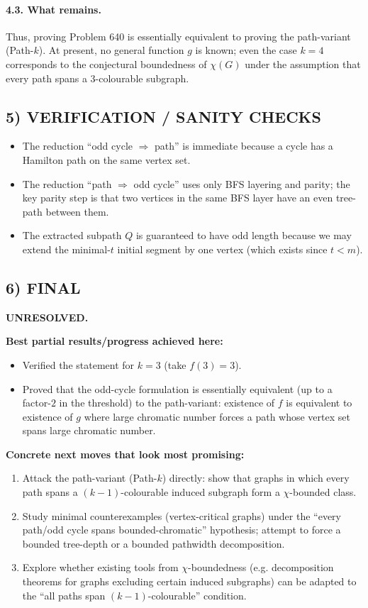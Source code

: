 \paragraph{4.3. What remains.}
Thus, proving Problem 640 is essentially equivalent to proving the path-variant (Path-$k$).
At present, no general function $g$ is known; even the case $k=4$ corresponds to the conjectural boundedness of $\chi(G)$ under the assumption that every path spans a $3$-colourable subgraph.

\subsection*{5) VERIFICATION / SANITY CHECKS}
\begin{itemize}
\item The reduction ``odd cycle $\Rightarrow$ path'' is immediate because a cycle has a Hamilton path on the same vertex set.
\item The reduction ``path $\Rightarrow$ odd cycle'' uses only BFS layering and parity; the key parity step is that two vertices in the same BFS layer have an even tree-path between them.
\item The extracted subpath $Q$ is guaranteed to have odd length because we may extend the minimal-$t$ initial segment by one vertex (which exists since $t<m$).
\end{itemize}

\subsection*{6) FINAL}
\noindent\textbf{UNRESOLVED.}

\smallskip
\noindent\textbf{Best partial results/progress achieved here:}
\begin{itemize}
\item Verified the statement for $k=3$ (take $f(3)=3$).
\item Proved that the odd-cycle formulation is essentially equivalent (up to a factor-$2$ in the threshold) to the path-variant: existence of $f$ is equivalent to existence of $g$ where large chromatic number forces a path whose vertex set spans large chromatic number.
\end{itemize}

\noindent\textbf{Concrete next moves that look most promising:}
\begin{enumerate}[label=\arabic*.]
\item Attack the path-variant (Path-$k$) directly: show that graphs in which every path spans a $(k-1)$-colourable induced subgraph form a $\chi$-bounded class.
\item Study minimal counterexamples (vertex-critical graphs) under the ``every path/odd cycle spans bounded-chromatic'' hypothesis; attempt to force a bounded tree-depth or a bounded pathwidth decomposition.
\item Explore whether existing tools from $\chi$-boundedness (e.g. decomposition theorems for graphs excluding certain induced subgraphs) can be adapted to the ``all paths span $(k-1)$-colourable'' condition.
\end{enumerate}

